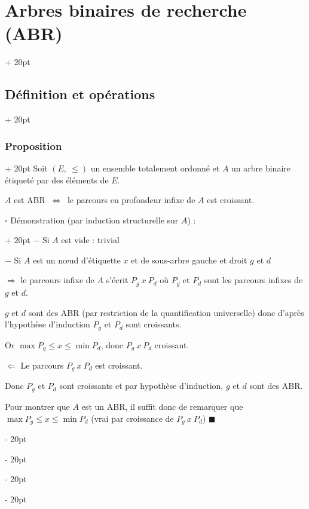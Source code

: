 \documentclass[a4paper, 12pt, twoside]{article}
\newcommand{\ssi}{\ \Leftrightarrow \ }
\renewcommand{\le}{\leqslant}
\newcommand{\ind}[1][20pt]{\advance\leftskip + #1}
\newcommand{\deind}[1][20pt]{\advance\leftskip - #1}
\newenvironment{indt}[2][20pt]{#2 \par \ind[#1]}{\par \deind} %
\begin{document}
\begin{indt}{\section{Arbres binaires de recherche (ABR)}}
\begin{indt}{\subsection{Définition et opérations}}
            \vspace{12pt}
            
            \begin{indt}{\subsubsection{Proposition}}
                Soit $(E,\ \le)$ un ensemble totalement ordonné et $A$ un arbre binaire étiqueté par des éléments de $E$.
                
                $A$ est ABR $\ssi$ le parcours en profondeur infixe de $A$ est croissant.
                
                \vspace{12pt}
                
                \begin{indt}{$\square$ Démonstration (par induction structurelle sur $A$) :}
                    $-$ Si $A$ est vide : trivial
                    
                    $-$ Si $A$ est un n\oe ud d'étiquette $x$ et de sous-arbre gauche et droit $g$ et $d$
                    
                    \vspace{6pt}
                    
                    $\Rightarrow$ le parcours infixe de $A$ s'écrit $P_g\ x\ P_d$ où $P_g$ et $P_d$ sont les parcours infixes de $g$ et $d$.
                    
                    $g$ et $d$ sont des ABR (par restriction de la quantification universelle) donc d'après l'hypothèse d'induction $P_g$ et $P_d$ sont croissants.
                    
                    Or $\max P_g \le x \le \min P_d$, donc $P_g\ x\ P_d$ croissant.
                    
                    \vspace{6pt}
                    
                    $\Leftarrow$ Le parcours $P_g\ x\ P_d$ est croissant.
                    
                    Donc $P_g$ et $P_d$ sont croissants et par hypothèse d'induction, $g$ et $d$ sont des ABR.
                    
                    Pour montrer que $A$ est un ABR, il suffit donc de remarquer que $\max P_g \le x \le \min P_d$ (vrai par croissance de $P_g\ x\ P_d$) $\blacksquare$
                \end{indt}
            \end{indt}
            

\end{indt}
\end{indt}
\end{document}
